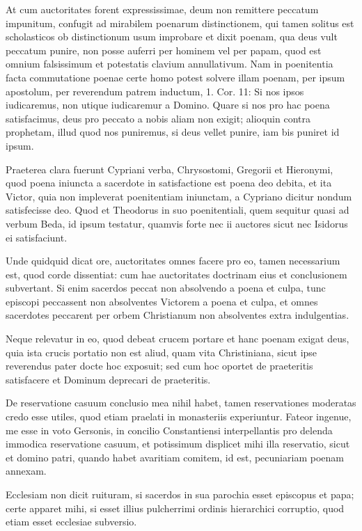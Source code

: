 At cum auctoritates forent expressissimae, deum non remittere peccatum impunitum, confugit ad mirabilem poenarum distinctionem, qui tamen solitus est scholasticos ob distinctionum usum improbare et dixit poenam, qua deus vult peccatum punire, non posse auferri per hominem vel per papam, quod est omnium falsissimum et potestatis clavium annullativum. Nam in poenitentia facta commutatione poenae certe homo potest solvere illam poenam, per ipsum apostolum, per reverendum patrem inductum, 1. Cor. 11: Si nos ipsos iudicaremus, non utique iudicaremur a Domino. Quare si nos pro hac poena satisfacimus, deus pro peccato a nobis aliam non exigit; alioquin contra prophetam, illud quod nos puniremus, si deus vellet punire, iam bis puniret id ipsum.

\marginpar{\small[381]} Praeterea clara fuerunt Cypriani verba, Chrysostomi, Gregorii et Hieronymi, quod poena iniuncta a sacerdote in satisfactione est poena deo debita, et ita Victor, quia non impleverat poenitentiam iniunctam, a Cypriano dicitur nondum satisfecisse deo. Quod et Theodorus in suo poenitentiali, quem sequitur quasi ad verbum Beda, id ipsum testatur, quamvis forte nec ii auctores sicut nec Isidorus ei satisfaciunt.

Unde quidquid dicat ore, auctoritates omnes facere pro eo, tamen necessarium est, quod corde dissentiat: cum hae auctoritates doctrinam eius et conclusionem subvertant. Si enim sacerdos peccat non absolvendo a poena et culpa, tunc episcopi peccassent non absolventes Victorem a poena et culpa, et omnes sacerdotes peccarent per orbem Christianum non absolventes extra indulgentias.

Neque relevatur in eo, quod debeat crucem portare et hanc poenam exigat deus, quia ista crucis portatio non est aliud, quam vita Christiniana, sicut ipse reverendus pater docte hoc exposuit; sed cum hoc oportet de praeteritis satisfacere et Dominum deprecari de praeteritis.

De reservatione casuum conclusio mea nihil habet, tamen reservationes moderatas credo esse utiles, quod etiam praelati in monasteriis experiuntur. Fateor ingenue, me esse in voto Gersonis, in concilio Constantiensi interpellantis pro delenda immodica reservatione casuum, et potissimum displicet mihi illa reservatio, sicut et domino patri, quando habet avaritiam comitem, id est, pecuniariam poenam annexam.

Ecclesiam non dicit ruituram, si sacerdos in sua parochia esset episcopus et papa; certe apparet mihi, si esset illius pulcherrimi ordinis hierarchici corruptio, quod etiam esset ecclesiae subversio.

